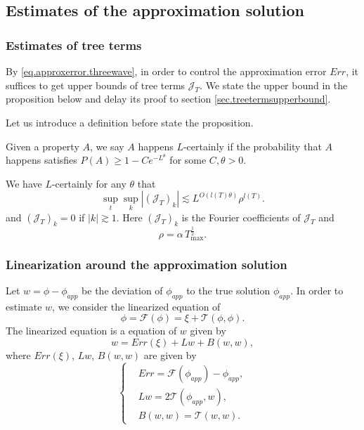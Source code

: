 \subsection{Estimates of the approximation solution}

\subsubsection{Estimates of tree terms} By \eqref{eq.approxerror.threewave}, in order to control the approximation error $Err$, it suffices to get upper bounds of tree terms $\mathcal{J}_T$. We state the upper bound in the proposition below and delay its proof to section \ref{sec.treetermsupperbound}.

Let us introduce a definition before state the proposition.

\begin{defn}\label{def.Lcertainly}
Given a property $A$, we say $A$ happens $L$-certainly if the probability that $A$ happens satisfies $P(A)\ge 1-Ce^{-L^\theta}$ for some $C, \theta>0$.
\end{defn}

\begin{prop}\label{prop.treetermsupperbound}
We have $L$-certainly for any $\theta$ that 
\begin{equation}\label{eq.treetermsupperbound.threewave}
    \sup_t\sup_k  |(\mathcal{J}_T)_k|\lesssim L^{O(l(T)\theta)} \rho^{l(T)}.
\end{equation}
and $(\mathcal{J}_T)_k=0$ if $|k|\gtrsim 1$. Here $(\mathcal{J}_T)_k$ is the Fourier coefficients of $\mathcal{J}_T$ and \begin{equation}
    \rho=\alpha\, T^{\frac{1}{2}}_{\text{max}}.
\end{equation}
\end{prop}

\subsubsection{Linearization around the approximation solution} Let $w=\phi-\phi_{app}$ be the deviation of $\phi_{app}$ to the true solution $\phi_{app}$. In order to estimate $w$, we consider the linearized equation of
\begin{equation}
    \phi=\mathcal{F}(\phi)=\xi+\mathcal{T}(\phi,\phi).
\end{equation}
The linearized equation is a equation of $w$ given by
\begin{equation}\label{eq.eqw.threewave}
    w= Err(\xi)+Lw+B(w,w),
\end{equation}
where $Err(\xi)$, $Lw$, $B(w,w)$ are given by
\begin{equation}
\left\{
\begin{aligned}
    &Err=\mathcal{F}(\phi_{app})-\phi_{app},
    \\
    &Lw=2\mathcal{T}(\phi_{app},w),
    \\
    &B(w,w)=\mathcal{T}(w,w).
\end{aligned}\right.
\end{equation}

